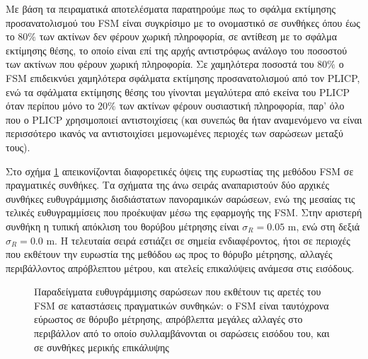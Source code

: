 Με βάση τα πειραματικά αποτελέσματα παρατηρούμε πως το σφάλμα εκτίμησης
προσανατολισμού του FSM είναι συγκρίσιμο με το ονομαστικό σε συνθήκες
όπου έως το $80\%$ των ακτίνων δεν φέρουν χωρική πληροφορία, σε αντίθεση με το
σφάλμα εκτίμησης θέσης, το οποίο είναι επί της αρχής αντιστρόφως ανάλογο του
ποσοστού των ακτίνων που φέρουν χωρική πληροφορία. Σε χαμηλότερα ποσοστά του
$80\%$ ο FSM επιδεικνύει χαμηλότερα σφάλματα εκτίμησης προσανατολισμού
από τον PLICP, ενώ τα σφάλματα εκτίμησης θέσης του γίνονται μεγαλύτερα από
εκείνα του PLICP όταν περίπου μόνο το $20\%$ των ακτίνων φέρουν ουσιαστική
πληροφορία, παρ' όλο που ο PLICP χρησιμοποιεί αντιστοιχίσεις (και συνεπώς θα
ήταν αναμενόμενο να είναι περισσότερο ικανός να αντιστοιχίσει μεμονωμένες
περιοχές των σαρώσεων μεταξύ τους).

Στο σχήμα \ref{fig:02_05_04:05} απεικονίζονται διαφορετικές όψεις της ευρωστίας
της μεθόδου FSM σε πραγματικές συνθήκες. Τα σχήματα της άνω σειράς
αναπαριστούν δύο αρχικές συνθήκες ευθυγράμμισης δισδιάστατων πανοραμικών
σαρώσεων, ενώ της μεσαίας τις τελικές ευθυγραμμίσεις που προέκυψαν μέσω της
εφαρμογής της FSM. Στην αριστερή συνθήκη η τυπική απόκλιση του θορύβου
μέτρησης είναι $\sigma_R = 0.05$ m, ενώ στη δεξιά $\sigma_R = 0.0$ m. Η
τελευταία σειρά εστιάζει σε σημεία ενδιαφέροντος, ήτοι σε περιοχές που εκθέτουν
την ευρωστία της μεθόδου ως προς το θόρυβο μέτρησης, αλλαγές περιβάλλοντος
απρόβλεπτου μέτρου, και ατελείς επικαλύψεις ανάμεσα στις εισόδους.

\begin{figure}[]\centering
  
  \vspace{-1cm}
  \caption{\small Παραδείγματα ευθυγράμμισης σαρώσεων που εκθέτουν τις αρετές
           του FSM σε καταστάσεις πραγματικών συνθηκών: ο FSM
           είναι ταυτόχρονα εύρωστος σε θόρυβο μέτρησης, απρόβλεπτα μεγάλες
           αλλαγές στο περιβάλλον από το οποίο συλλαμβάνονται οι σαρώσεις
           εισόδου του, και σε συνθήκες μερικής επικάλυψης}
  \label{fig:02_05_04:05}
\end{figure}
